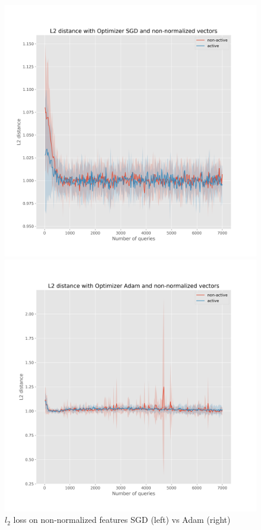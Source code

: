 \documentclass{article}
\begin{document}
\begin{figure}[!h]
  \centering
  \begin{minipage}{.45\textwidth}
    \centering
    \includegraphics[width=\linewidth]{active-vs-base-mnist-l2-loss-SGD-non-normalized-ci}
  \end{minipage}%
  \begin{minipage}{.45\textwidth}
    \centering
    \includegraphics[width=\linewidth]{active-vs-base-mnist-l2-loss-Adam-non-normalized-ci}
  \end{minipage}
  \caption{$l_2$ loss on non-normalized features SGD (left) vs Adam (right)}\label{fig:l2-loss-non-normalized-ci-mnist}
\end{figure}
\end{document}
